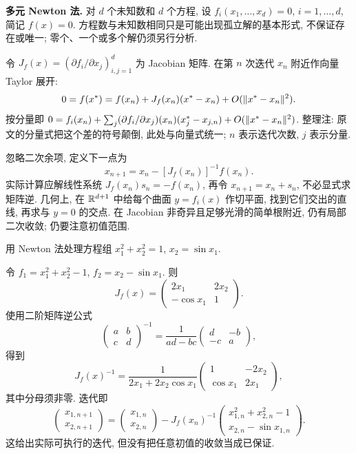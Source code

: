 \textbf{多元 Newton 法.} 对 $d$ 个未知数和 $d$ 个方程, 设 $f_i(x_1,\ldots,x_d)=0$, $i=1,\ldots,d$, 简记 $f(x)=0$. 方程数与未知数相同只是可能出现孤立解的基本形式, 不保证存在或唯一; 零个、一个或多个解仍须另行分析.

令 $J_f(x)=(\partial f_i/\partial x_j)_{i,j=1}^{d}$ 为 Jacobian 矩阵. 在第 $n$ 次迭代 $x_n$ 附近作向量 Taylor 展开:
\[
0=f(x^*)=f(x_n)+J_f(x_n)(x^*-x_n)+O(\lVert x^*-x_n\rVert^2).
\]
按分量即 $0=f_i(x_n)+\sum_j(\partial f_i/\partial x_j)(x_n)(x_j^*-x_{j,n})+O(\lVert x^*-x_n\rVert^2)$. 整理注: 原文的分量式把这个差的符号颠倒, 此处与向量式统一; $n$ 表示迭代次数, $j$ 表示分量.

忽略二次余项, 定义下一点为
\[
x_{n+1}=x_n-[J_f(x_n)]^{-1}f(x_n).
\]
实际计算应解线性系统 $J_f(x_n)s_n=-f(x_n)$, 再令 $x_{n+1}=x_n+s_n$, 不必显式求矩阵逆. 几何上, 在 $\mathbb R^{d+1}$ 中给每个曲面 $y=f_i(x)$ 作切平面, 找到它们交出的直线, 再求与 $y=0$ 的交点. 在 Jacobian 非奇异且足够光滑的简单根附近, 仍有局部二次收敛; 仍要注意初值范围.

\begin{example}\label{ex:circle-sine-newton}
用 Newton 法处理方程组 $x_1^2+x_2^2=1$, $x_2=\sin x_1$.
\end{example}
\begin{solution}
令 $f_1=x_1^2+x_2^2-1$, $f_2=x_2-\sin x_1$. 则
\[
J_f(x)=\begin{pmatrix}2x_1&2x_2\\-\cos x_1&1\end{pmatrix}.
\]
使用二阶矩阵逆公式
\[
\begin{pmatrix}a&b\\c&d\end{pmatrix}^{-1}
=\frac1{ad-bc}\begin{pmatrix}d&-b\\-c&a\end{pmatrix},
\]
得到
\[
J_f(x)^{-1}=\frac1{2x_1+2x_2\cos x_1}
\begin{pmatrix}1&-2x_2\\\cos x_1&2x_1\end{pmatrix},
\]
其中分母须非零. 迭代即
\[
\begin{pmatrix}x_{1,n+1}\\x_{2,n+1}\end{pmatrix}
=\begin{pmatrix}x_{1,n}\\x_{2,n}\end{pmatrix}
-J_f(x_n)^{-1}
\begin{pmatrix}x_{1,n}^2+x_{2,n}^2-1\\x_{2,n}-\sin x_{1,n}\end{pmatrix}.
\]
这给出实际可执行的迭代, 但没有把任意初值的收敛当成已保证.
\end{solution}

